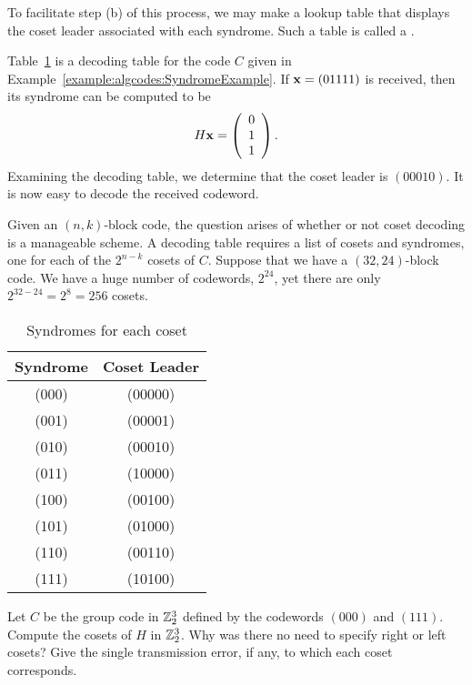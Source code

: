 To facilitate step (b) of this process, we may make a lookup table that displays the coset leader associated
with each syndrome. Such a table is called a . 
 
\begin{example}{}
Table~\ref{table:algcodes:DecodingTable} is a decoding table for the code $C$ given in Example~\ref{example:algcodes:SyndromeExample}. If
${\bold x} = (01111)$ is received, then its syndrome can be computed
to be
\[
H {\bold x} =
\left(
\begin{array}{c}
0 \\
1 \\
1
\end{array}
\right).
\]
Examining the decoding table, we determine that the coset leader is
$(00010)$. It is now easy to decode the received codeword. 
\end{example} 
 
Given an $(n,k)$-block code, the question arises of whether or not
coset decoding is a manageable scheme.  A decoding table requires a
list of cosets and syndromes, one for each of the $2^{n-k}$ cosets of
$C$.  Suppose that we have a $(32, 24)$-block code.  We have a huge
number of codewords, $2^{24}$, yet there are only $2^{32-24} = 2^{8} =
256$ cosets.  
 
\begin{table}[htb]
\caption{Syndromes for each coset \label{table:algcodes:DecodingTable}}{\small
\begin{center}
\begin{tabular}{|c|c|}
\hline
Syndrome & Coset Leader \\
\hline
(000) & (00000) \\
(001) & (00001) \\
(010) & (00010) \\
(011) & (10000) \\
(100) & (00100) \\
(101) & (01000) \\
(110) & (00110) \\
(111) & (10100) \\
\hline
\end{tabular}
\end{center}
}
\end{table}
 
 
\begin{exercise}{}
Let $C$ be the group code in ${\Bbb Z}_2^3$ defined by the codewords
$(000)$ and $(111)$. Compute the cosets of $H$ in ${\Bbb Z}_2^3$. Why
was there no need to specify right or left cosets? Give the
single transmission error, if any, to which each coset corresponds.
 \end{exercise}
 
